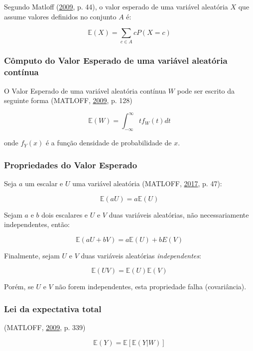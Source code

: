 \documentclass[a4paper, 12pt]{article}
\begin{document}
Segundo Matloff (\protect\hyperlink{ref-matloff2009}{2009}, p. 44), o
valor esperado de uma variável aleatória \(X\) que assume valores
definidos no conjunto \(A\) é:

\[\mathbb{E}(X) = \sum_{c \in A}cP(X=c)\]

\subsubsection{Cômputo do Valor Esperado de uma variável aleatória
contínua}\label{computo-do-valor-esperado-de-uma-variavel-aleatoria-continua}

O Valor Esperado de uma variável aleatória contínua \(W\) pode ser
escrito da seguinte forma (MATLOFF,
\protect\hyperlink{ref-matloff2009}{2009}, p. 128)

\[\mathbb{E}(W) = \int_{-\infty}^{\infty}tf_W(t)dt\]

onde \(f_Y(x)\) é a função densidade de probabilidade de \(x\).

\subsubsection{Propriedades do Valor
Esperado}\label{propriedades-do-valor-esperado}

Seja \(a\) um escalar e \(U\) uma variável aleatória (MATLOFF,
\protect\hyperlink{ref-matloff2017}{2017}, p. 47):

\[\mathbb{E}(aU) = a\mathbb{E}(U)\]

Sejam \(a\) e \(b\) dois escalares e \(U\) e \(V\) duas variáveis
aleatórias, não necessariamente independentes, então:

\[\mathbb{E}(aU + bV) = a\mathbb{E}(U) + bE(V)\]

Finalmente, sejam \(U\) e \(V\) duas variáveis aleatórias
\emph{independentes}:

\[\mathbb{E}(UV) = \mathbb{E}(U)\mathbb{E}(V)\]

Porém, se \(U\) e \(V\) não forem independentes, esta propriedade falha
(covariância).

\subsubsection{Lei da expectativa total}\label{lei-da-expectativa-total}

(MATLOFF, \protect\hyperlink{ref-matloff2009}{2009}, p. 339)

\[\mathbb{E}(Y) = \mathbb{E}[\mathbb{E}(Y|W)]\]
\end{document}
